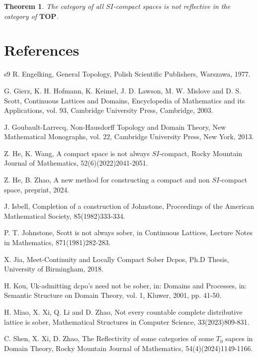 \documentclass[preprint,12pt]{elsarticle}
\numberwithin{equation}{section}
\newtheorem{theorem}{Theorem}[section]
\begin{document}
\begin{theorem} The category of all $SI$-compact spaces is not reflective in the category of $\mathbf{TOP}$.
\end{theorem}




\section*{References}
\begin{thebibliography}{s9}
 R. Engelking, General Topology, Polish Scientific Publishers, Warszawa, 1977.

 G. Gierz, K. H. Hofmann, K. Keimel, J. D. Lawson, M. W. Mislove and D. S. Scott, Continuous Lattices and Domains, Encyclopedia of Mathematics and its Applications, vol. 93, Cambridge University Press, Cambridge, 2003.
    
 J. Goubault-Larrecq, Non-Hausdorff Topology and Domain Theory, New Mathematical Monographs, vol. 22, Cambridge University Press, New York, 2013.
    

 Z. He, K. Wang, A compact space is not always $SI$-compact, Rocky Mountain Journal of Mathematics, 52(6)(2022)2041-2051.
    
 Z. He, B. Zhao, A new method for constructing a compact and non
$SI$-compact space, preprint, 2024.    
    

 J. Isbell, Completion of a construction of Johnstone, Proceedings of the American Mathematical Society, 85(1982)333-334.
    
    

 P. T. Johnstone, Scott is not always sober, in Continuous Lattices, Lecture Notes in Mathematics, 871(1981)282-283.
 
 X. Jia, Meet-Continuity and Locally Compact Sober Dcpos, Ph.D Thesis, University of Birmingham, 2018.
   
   
 H. Kou, Uk-admitting dcpo's need not be sober, in: Domains and Processes, in: Semantic Structure on Domain Theory, vol. 1, Kluwer, 2001, pp. 41-50.

 H. Miao, X. Xi, Q. Li and D. Zhao, Not every countable complete distributive lattice is sober, Mathematical Structures in Computer Science, 33(2023)809-831.

 C. Shen, X. Xi, D. Zhao, The Reflectivity of some categories of some $T_{0}$ sapces in Domain Theory, Rocky Mountain Journal of Mathematics, 54(4)(2024)1149-1166.


\end{thebibliography}
\end{document}

